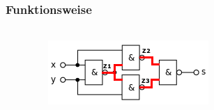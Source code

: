 \begin{frame}
    \frametitle{Funktionsweise}
    \framesubtitle{}
    \begin{columns}[c]
            \begin{center}
            \end{center}
            \begin{figure}[H]
            \begin{center}
                    \includegraphics[scale=0.7]{./img/schaltung/xornand_fun_00.png}
            \end{center}
            \end{figure}
    \end{columns}
\end{frame}
